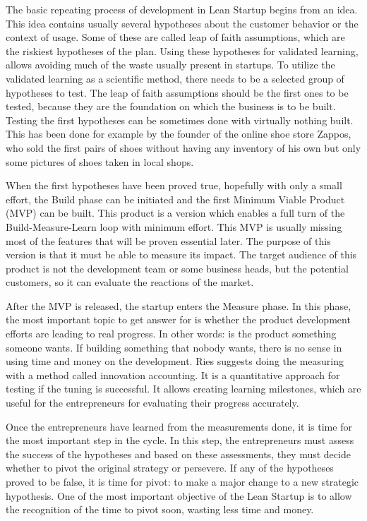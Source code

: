 The basic repeating process of development in Lean Startup begins from an idea. This idea contains usually several hypotheses about the customer behavior or the context of usage. Some of these are called leap of faith assumptions, which are the riskiest hypotheses of the plan. Using these hypotheses for validated learning, allows avoiding much of the waste usually present in startups. To utilize the validated learning as a scientific method, there needs to be a selected group of hypotheses to test. The leap of faith assumptions should be the first ones to be tested, because they are the foundation on which the business is to be built. Testing the first hypotheses can be sometimes done with virtually nothing built. This has been done for example by the founder of the online shoe store Zappos, who sold the first pairs of shoes without having any inventory of his own but only some pictures of shoes taken in local shops.

When the first hypotheses have been proved true, hopefully with only a small effort, the Build phase can be initiated and the first Minimum Viable Product (MVP) can be built. This product is a version which enables a full turn of the Build-Measure-Learn loop with minimum effort. This MVP is usually missing most of the features that will be proven essential later. The purpose of this version is that it must be able to measure its impact. The target audience of this product is not the development team or some business heads, but the potential customers, so it can evaluate the reactions of the market.

After the MVP is released, the startup enters the Measure phase. In this phase, the most important topic to get answer for is whether the product development efforts are leading to real progress. In other words: is the product something someone wants. If building something that nobody wants, there is no sense in using time and money on the development. Ries suggests doing the measuring with a method called innovation accounting. It is a quantitative approach for testing if the tuning is successful. It allows creating learning milestones, which are useful for the entrepreneurs for evaluating their progress accurately.

Once the entrepreneurs have learned from the measurements done, it is time for the most important step in the cycle. In this step, the entrepreneurs must assess the success of the hypotheses and based on these assessments, they must decide whether to pivot the original strategy or persevere. If any of the hypotheses proved to be false, it is time for pivot: to make a major change to a new strategic hypothesis. One of the most important objective of the Lean Startup is to allow the recognition of the time to pivot soon, wasting less time and money.

